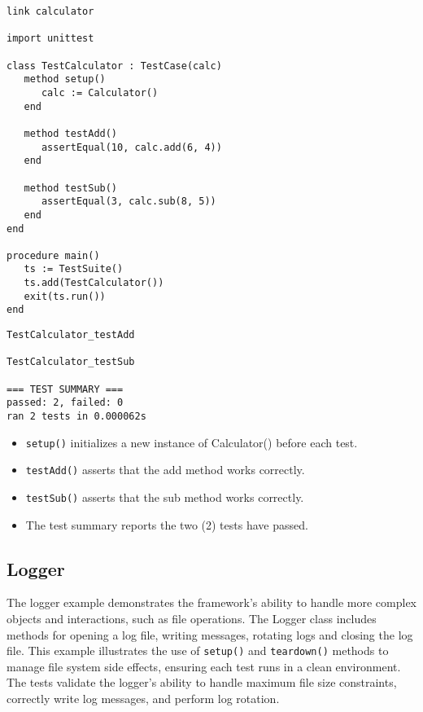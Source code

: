 \documentclass[letterpaper,12pt]{article}
\begin{document}
\bigskip {}
\begin{verbatim}
link calculator

import unittest

class TestCalculator : TestCase(calc)
   method setup()
      calc := Calculator()
   end

   method testAdd()
      assertEqual(10, calc.add(6, 4))
   end

   method testSub()
      assertEqual(3, calc.sub(8, 5))
   end
end

procedure main()
   ts := TestSuite()
   ts.add(TestCalculator())
   exit(ts.run())
end
\end{verbatim}

\bigskip{}
\begin{verbatim}
TestCalculator_testAdd

TestCalculator_testSub

=== TEST SUMMARY ===
passed: 2, failed: 0
ran 2 tests in 0.000062s
\end{verbatim}

\begin{itemize}
   \item \texttt{setup()} initializes a new instance of Calculator() before each test.
   \item \texttt{testAdd()} asserts that the add method works correctly.
   \item \texttt{testSub()} asserts that the sub method works correctly.
   \item The test summary reports the two (2) tests have passed.
\end{itemize}

\newpage\subsection{Logger}

The logger example demonstrates the framework's ability to handle more complex objects and interactions, such as file operations. The Logger class includes methods for opening a log file, writing messages, rotating logs and closing the log file. This example illustrates the use of \texttt{setup()} and \texttt{teardown()} methods to manage file system side effects, ensuring each test runs in a clean environment. The tests validate the logger's ability to handle maximum file size constraints, correctly write log messages, and perform log rotation.
\end{document}
